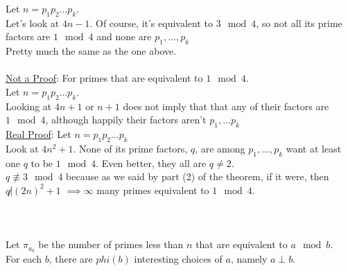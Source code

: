   Let $n = p_1p_2\ldots p_k$.\\
  Let's look at $4n - 1$. Of course, it's equivalent to $3 \mod 4$, so not all
  its prime factors are $1 \mod 4$ and none are $p_1, \ldots , p_k$\\
  Pretty much the same as the one above.\\ \\
  \underline{Not a Proof}: For primes that are equivalent to $1 \mod 4$.\\
  Let $n = p_1p_2 \ldots p_k$.\\
  Looking at $4n + 1$ or $n +1$ does not imply that that any of their factors are
  $1 \mod 4$, although happily their factors aren't $p_1, \ldots p_k$\\
  \underline{Real Proof}: Let $n = p_1p_2\ldots p_k$\\
  Look at $4n^2 + 1$. None of its prime factors, $q$, are among $p_1, \ldots,
  p_k$ want at least one $q$ to be $1 \mod 4$. Even better, they all are $q \not=
  2$.\\
  $q \not\equiv 3 \mod 4$ because as we said by part (2) of the theorem, if it
  were, then $q \not| (2n)^2 + 1$ $\implies \infty$ many primes equivalent to
  $1 \mod 4$.\\\\
  \\\\
  Let $\pi_{a_b}$ be the number of primes less than $n$ that are equivalent to
  $a \mod b$.\\
  For each $b$, there are $phi(b)$ interesting choices of $a$, namely $a \perp 
  b$.\\\\
  \\\\\\
  \\\\
  
